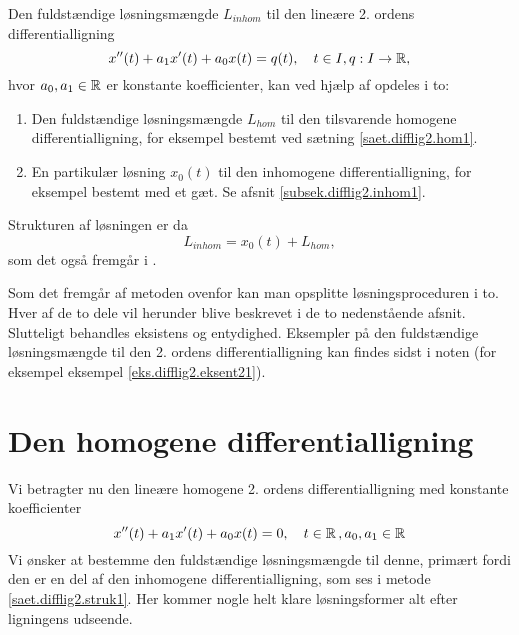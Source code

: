 \begin{method} \label{saet.difflig2.struk1}
Den fuldstændige løsningsmængde $ L_{inhom} $ til den lineære 2. ordens differentialligning
\begin{equation}
x''(t) + a_1x'(t) + a_0x(t) = q(t), \quad t \in I, q : I \rightarrow \mathbb{R}, \label{lig.saet.difflig2.struk1}
\end{equation}
hvor $ a_0, a_1 \in \mathbb{R} $ er konstante koefficienter, kan ved hjælp af  opdeles i to:
\begin{enumerate}
\item Den fuldstændige løsningsmængde $ L_{hom} $ til den tilsvarende homogene differentialligning, for eksempel bestemt ved sætning \ref{saet.difflig2.hom1}.
\item En partikulær løsning $ x_0(t) $ til den inhomogene differentialligning, for eksempel bestemt med et gæt. Se afsnit \ref{subsek.difflig2.inhom1}.
\end{enumerate}
Strukturen af løsningen er da
\begin{equation}
L_{inhom} = x_0(t) + L_{hom},
\end{equation}
som det også fremgår i .
\end{method}

Som det fremgår af metoden ovenfor kan man opsplitte løsningsproceduren i to. Hver af de to dele vil herunder blive beskrevet i de to nedenstående afsnit. Slutteligt behandles eksistens og entydighed. \bs
Eksempler på den fuldstændige løsningsmængde til den 2. ordens differentialligning kan findes sidst i noten (for eksempel eksempel \ref{eks.difflig2.eksent21}).

\section{Den homogene differentialligning} \label{subsek.difflig2.hom1}

Vi betragter nu den lineære homogene 2. ordens differentialligning med konstante koefficienter
\begin{equation}
x''(t) + a_1x'(t) + a_0x(t) = 0, \quad t \in \mathbb{R} \,, a_0,a_1 \in \mathbb{R}
\end{equation}
Vi ønsker at bestemme den fuldstændige løsningsmængde til denne, primært fordi den er en del af den inhomogene differentialligning, som ses i metode \ref{saet.difflig2.struk1}. Her kommer nogle helt klare løsningsformer alt efter ligningens udseende.

